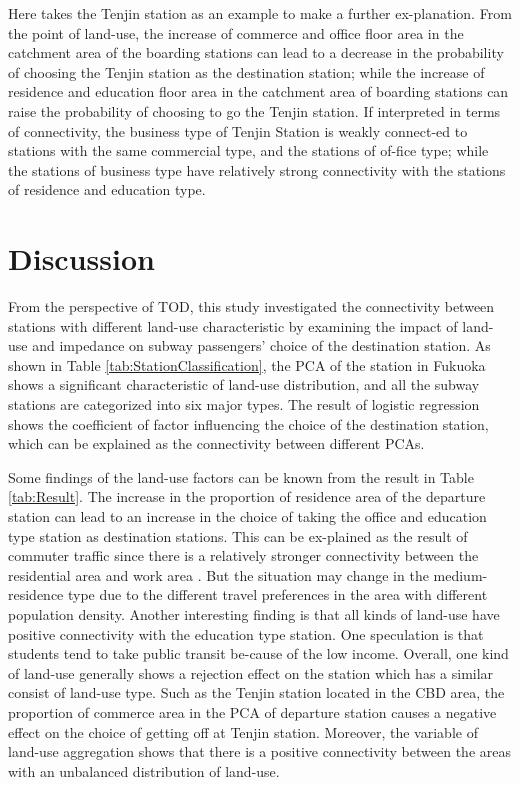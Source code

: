 \documentclass[utf8]{article}
\begin{document}
%
Here takes the Tenjin station as an example to make a further ex-planation. From the point of land-use, the increase of commerce and office floor area in the catchment area of the boarding stations can lead to a decrease in the probability of choosing the Tenjin station as the destination station; while the increase of residence and education floor area in the catchment area of boarding stations can raise the probability of choosing to go the Tenjin station. If interpreted in terms of connectivity, the business type of Tenjin Station is weakly connect-ed to stations with the same commercial type, and the stations of of-fice type; while the stations of business type have relatively strong connectivity with the stations of residence and education type.

\section{Discussion}
\indent

%
From the perspective of TOD, this study investigated the connectivity between stations with different land-use characteristic by examining the impact of land-use and impedance on subway passengers' choice of the destination station. As shown in Table \ref{tab:StationClassification}, the PCA of the station in Fukuoka shows a significant characteristic of land-use distribution, and all the subway stations are categorized into six major types. The result of logistic regression shows the coefficient of factor influencing the choice of the destination station, which can be explained as the connectivity between different PCAs.

%
Some findings of the land-use factors can be known from the result in Table \ref{tab:Result}. The increase in the proportion of residence area of the departure station can lead to an increase in the choice of taking the office and education type station as destination stations. This can be ex-plained as the result of commuter traffic since there is a relatively stronger connectivity between the residential area and work area \cite{Badoe2000}. But the situation may change in the medium-residence type due to the different travel preferences in the area with different population density. Another interesting finding is that all kinds of land-use have positive connectivity with the education type station. One speculation is that students tend to take public transit be-cause of the low income. Overall, one kind of land-use generally shows a rejection effect on the station which has a similar consist of land-use type. Such as the Tenjin station located in the CBD area, the proportion of commerce area in the PCA of departure station causes a negative effect on the choice of getting off at Tenjin station. Moreover, the variable of land-use aggregation shows that there is a positive connectivity between the areas with an unbalanced distribution of land-use.
\end{document}
